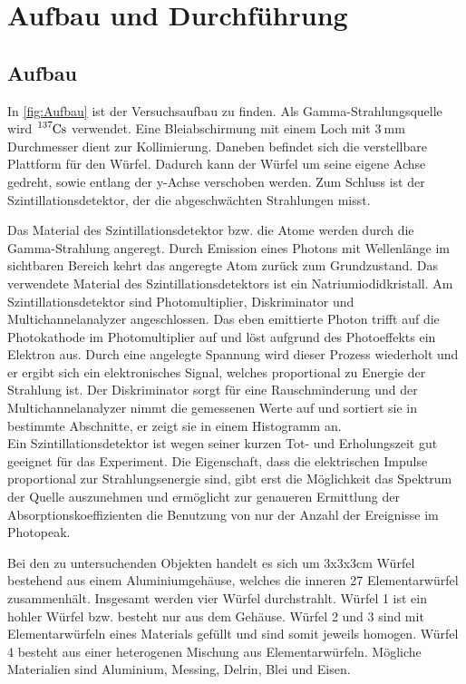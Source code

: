 \section{Aufbau und Durchführung}
\label{sec:Durchführung}

\subsection{Aufbau}
In \autoref{fig:Aufbau} ist der Versuchsaufbau zu finden.
Als Gamma-Strahlungsquelle wird $\ce{^{137}Cs}$ verwendet.
Eine Bleiabschirmung mit einem Loch mit $\SI{3}{\milli\metre}$ Durchmesser dient zur Kollimierung.
Daneben befindet sich die verstellbare Plattform für den Würfel.
Dadurch kann der Würfel um seine eigene Achse gedreht, sowie entlang der y-Achse verschoben werden.
Zum Schluss ist der Szintillationsdetektor, der die abgeschwächten Strahlungen misst.

\noindent
Das Material des Szintillationsdetektor bzw. die Atome werden durch die Gamma-Strahlung angeregt.
Durch Emission eines Photons mit Wellenlänge im sichtbaren Bereich kehrt das angeregte Atom zurück zum Grundzustand.
Das verwendete Material des Szintillationsdetektors ist ein Natriumiodidkristall.
Am Szintillationsdetektor sind Photomultiplier, Diskriminator und Multichannelanalyzer angeschlossen.
Das eben emittierte Photon trifft auf die Photokathode im Photomultiplier auf und löst aufgrund des Photoeffekts ein Elektron aus.
Durch eine angelegte Spannung wird dieser Prozess wiederholt und er ergibt sich ein elektronisches Signal, welches proportional zu Energie der Strahlung ist.
Der Diskriminator sorgt für eine Rauschminderung und der Multichannelanalyzer nimmt die gemessenen Werte auf und sortiert sie in bestimmte Abschnitte, er zeigt sie in einem Histogramm an.\\
Ein Szintillationsdetektor ist wegen seiner kurzen Tot- und Erholungszeit gut geeignet für das Experiment. 
Die Eigenschaft, dass die elektrischen Impulse proportional zur Strahlungsenergie sind, gibt erst die Möglichkeit das Spektrum der Quelle auszunehmen
und ermöglicht zur genaueren Ermittlung der Absorptionskoeffizienten die Benutzung von nur der Anzahl der Ereignisse im Photopeak. 

\noindent
Bei den zu untersuchenden Objekten handelt es sich um 3x3x3cm Würfel bestehend aus einem Aluminiumgehäuse, welches die inneren 27 Elementarwürfel zusammenhält.
Insgesamt werden vier Würfel durchstrahlt.
Würfel 1 ist ein hohler Würfel bzw. besteht nur aus dem Gehäuse.
Würfel 2 und 3 sind mit Elementarwürfeln eines Materials gefüllt und sind somit jeweils homogen.
Würfel 4 besteht aus einer heterogenen Mischung aus Elementarwürfeln.
Mögliche Materialien sind Aluminium, Messing, Delrin, Blei und Eisen.


